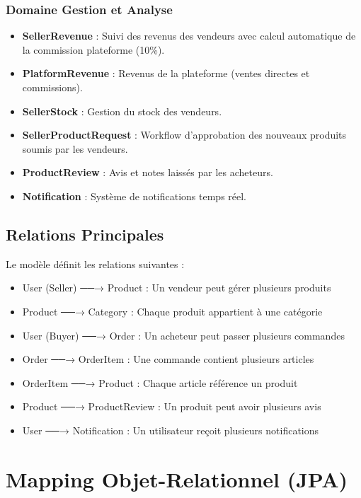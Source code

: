\documentclass[12pt,a4paper]{report}
\begin{document}
\subsubsection{Domaine Gestion et Analyse}

\begin{itemize}[noitemsep]
    \item \textbf{SellerRevenue} : Suivi des revenus des vendeurs avec calcul automatique de la commission plateforme (10\%).
    \item \textbf{PlatformRevenue} : Revenus de la plateforme (ventes directes et commissions).
    \item \textbf{SellerStock} : Gestion du stock des vendeurs.
    \item \textbf{SellerProductRequest} : Workflow d'approbation des nouveaux produits soumis par les vendeurs.
    \item \textbf{ProductReview} : Avis et notes laissés par les acheteurs.
    \item \textbf{Notification} : Système de notifications temps réel.
\end{itemize}

\subsection{Relations Principales}

Le modèle définit les relations suivantes :

\begin{itemize}[noitemsep]
    \item User (Seller) ──→ Product : Un vendeur peut gérer plusieurs produits
    \item Product ──→ Category : Chaque produit appartient à une catégorie
    \item User (Buyer) ──→ Order : Un acheteur peut passer plusieurs commandes
    \item Order ──→ OrderItem : Une commande contient plusieurs articles
    \item OrderItem ──→ Product : Chaque article référence un produit
    \item Product ──→ ProductReview : Un produit peut avoir plusieurs avis
    \item User ──→ Notification : Un utilisateur reçoit plusieurs notifications
\end{itemize}

\section{Mapping Objet-Relationnel (JPA)}
\end{document}
